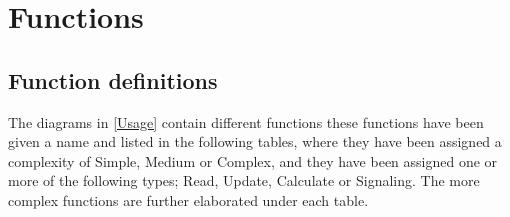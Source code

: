 	
	\chapter{Functions}
	\section{Function definitions}
	The diagrams in \cref{Usage} contain different functions these functions have been given a name and listed in the following tables, where they have been assigned a complexity of Simple, Medium or Complex, and they have been assigned one or more of the following types; Read, Update, Calculate or Signaling. The more complex functions are further elaborated under each table.

